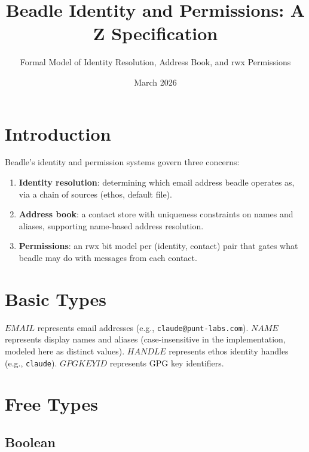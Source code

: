 \documentclass[a4paper,10pt,fleqn]{article}
\begin{document}
\title{Beadle Identity and Permissions: A Z Specification}
\author{Formal Model of Identity Resolution, Address Book, and rwx Permissions}
\date{March 2026}
\maketitle

\tableofcontents
\newpage

\section{Introduction}

Beadle's identity and permission systems govern three concerns:

\begin{enumerate}
\item \textbf{Identity resolution}: determining which email address beadle
  operates as, via a chain of sources (ethos, default file).
\item \textbf{Address book}: a contact store with uniqueness constraints on
  names and aliases, supporting name-based address resolution.
\item \textbf{Permissions}: an rwx bit model per (identity, contact) pair
  that gates what beadle may do with messages from each contact.
\end{enumerate}

\section{Basic Types}

\begin{zed}
\end{zed}

$EMAIL$ represents email addresses (e.g., \texttt{claude@punt-labs.com}).
$NAME$ represents display names and aliases (case-insensitive in the
implementation, modeled here as distinct values).
$HANDLE$ represents ethos identity handles (e.g., \texttt{claude}).
$GPGKEYID$ represents GPG key identifiers.

\section{Free Types}

\subsection{Boolean}
\end{document}
